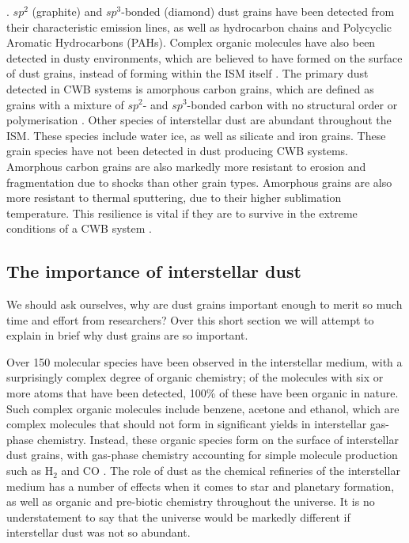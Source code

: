 .
$sp^2$ (graphite) and $sp^3$-bonded (diamond) dust grains have been detected from their characteristic emission lines, as well as hydrocarbon chains and Polycyclic Aromatic Hydrocarbons (PAHs).
Complex organic molecules have also been detected in dusty environments, which are believed to have formed on the surface of dust grains, instead of forming within the ISM itself
\parencite{herbstComplexOrganicInterstellar2009}.
The primary dust detected in CWB systems is amorphous carbon grains, which are defined as grains with a mixture of $sp^2$- and $sp^3$-bonded carbon with no structural order or polymerisation
\parencite{draineInterstellarDustGrains2003}.
Other species of interstellar dust are abundant throughout the ISM.
These species include water ice, as well as silicate and iron grains.
These grain species have not been detected in dust producing CWB systems.
Amorphous carbon grains are also markedly more resistant to erosion and fragmentation due to shocks than other grain types.
Amorphous grains are also more resistant to thermal sputtering, due to their higher sublimation temperature.
This resilience is vital if they are to survive in the extreme conditions of a CWB system
\parencite{draineDestructionMechanismsInterstellar1979}.

\subsection{The importance of interstellar dust}
\label{sec:dustimportance}

We should ask ourselves, why are dust grains important enough to merit so much time and effort from researchers?
Over this short section we will attempt to explain in brief why dust grains are so important.


Over 150 molecular species have been observed in the interstellar medium, with a surprisingly complex degree of organic chemistry; of the molecules with six or more atoms that have been detected, 100\% of these have been organic in nature.
Such complex organic molecules include benzene, acetone and ethanol, which are complex molecules that should not form in significant yields in interstellar gas-phase chemistry.
Instead, these organic species form on the surface of interstellar dust grains, with gas-phase chemistry accounting for simple molecule production such as $\text{H}_2$ and $\text{CO}$
\parencite{herbstComplexOrganicInterstellar2009}.
The role of dust as the chemical refineries of the interstellar medium has a number of effects when it comes to star and planetary formation, as well as organic and pre-biotic chemistry throughout the universe.
It is no understatement to say that the universe would be markedly different if interstellar dust was not so abundant.

